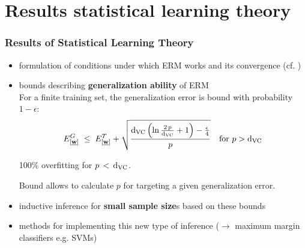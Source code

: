 \section{Results statistical learning theory}

\begin{frame}\frametitle{Results of Statistical Learning Theory}
		\begin{itemize}
			\item formulation of conditions under which ERM works and its convergence (cf. )
			\item bounds describing \textbf{generalization ability} of ERM \\
            
            For a finite training set, the generalization error is bound with probability $1-\epsilon$:
            \begin{equation}
				E^{G}_{[\underline{\mathbf{w}}]} \;\le\; E^{T}_{[\underline{\mathbf{w}}]} + \sqrt{\frac{\mathrm{d}_{\mathrm{VC}} \left(\ln \frac{2\,p}{\mathrm{d}_{\mathrm{VC}}} + 1\right)-\frac{\epsilon}{4}}{p}} \quad \text{for } p > \mathrm{d}_{\mathrm{VC}}
				\label{eq:generalizationresults}
            \end{equation}
            
            
            
            100\% overfitting for $p\,<\,\mathrm{d}_{\mathrm{VC}}$.
            
            Bound allows to calculate $p$ for targeting a given generalization error.
            
			\item inductive inference for \textbf{small sample size}s 
				based on these bounds
			\item methods for implementing this new type 
				of inference ($\rightarrow$ maximum margin classifiers e.g. {SVMs})
		\end{itemize}
\end{frame}
